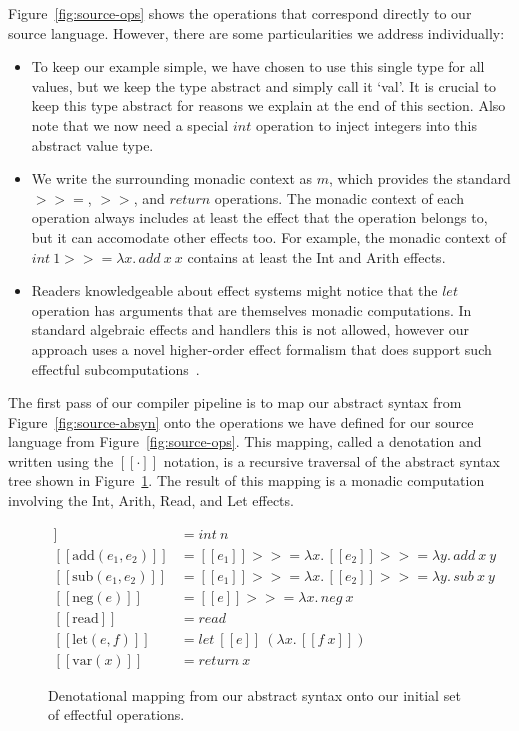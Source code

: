 \documentclass[a4paper,UKenglish,cleveref, autoref, thm-restate, anonymous]{oasics-v2021}
\newcommand\bind[1]{>\!\!>\!\!= \lambda #1.\,}
\begin{document}
Figure~\ref{fig:source-ops} shows the operations that correspond directly to our source language.
However, there are some particularities we address individually:
\begin{itemize}
  \item 
    To keep our example simple, we have chosen to use this single type for all values, but we keep the type abstract and simply call it `val'.
    It is crucial to keep this type abstract for reasons we explain at the end of this section.
    Also note that we now need a special $\mathit{int}$ operation to inject integers into this abstract value type.
  \item 
    We write the surrounding monadic context as $m$, which provides the standard $>\!\!>\!\!=$, $>\!\!>$, and $\mathit{return}$ operations.
    The monadic context of each operation always includes at least the effect that the operation belongs to, but it can accomodate other effects too.
    For example, the monadic context of $\mathit{int}~1 \bind{x} \mathit{add}~x~x$ contains at least the Int and Arith effects.
  \item
    Readers knowledgeable about effect systems might notice that the $\mathit{let}$ operation has arguments that are themselves monadic computations.
    In standard algebraic effects and handlers this is not allowed, however our approach uses a novel higher-order effect formalism that does support such effectful subcomputations~\cite{BachPoulsen2022heftyalgebras}.
\end{itemize}

The first pass of our compiler pipeline is to map our abstract syntax from Figure~\ref{fig:source-absyn} onto the operations we have defined for our source language from Figure~\ref{fig:source-ops}.
This mapping, called a denotation and written using the $[\![ \cdot ]\!]$ notation, is a recursive traversal of the abstract syntax tree shown in Figure~\ref{fig:den}.
The result of this mapping is a monadic computation involving the Int, Arith, Read, and Let effects.

\begin{figure}[ht]
\begin{align*}
  [\![ \mathrm{int}(n) ]\!] & = \mathit{int}~n \\
  [\![ \mathrm{add}(e_1, e_2) ]\!] & = [\![ e_1 ]\!] \bind{x} [\![ e_2 ]\!] \bind{y} \mathit{add}~x~y \\
  [\![ \mathrm{sub}(e_1, e_2) ]\!] & = [\![ e_1 ]\!] \bind{x} [\![ e_2 ]\!] \bind{y} \mathit{sub}~x~y \\
  [\![ \mathrm{neg}(e) ]\!] & = [\![ e ]\!] \bind{x} \mathit{neg}~x \\
  [\![ \mathrm{read} ]\!] & = \mathit{read} \\
  [\![ \mathrm{let}(e,f) ]\!] & = \mathit{let}~[\![e]\!]~(\lambda x.\, [\![ f~x ]\!]) \\
  [\![ \mathrm{var}(x) ]\!] & = \mathit{return}~x
\end{align*}
  \caption{Denotational mapping from our abstract syntax onto our initial set of effectful operations.}\label{fig:den}
\end{figure}
\end{document}
